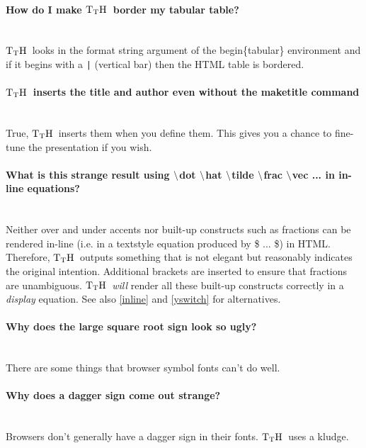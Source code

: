 \documentclass[12pt]{article}
\def\TtH{$\rm{}T_TH$}
\begin{document}
\paragraph{How do I make \TtH\ border my tabular table?}\leavevmode\\
\TtH\ looks in the format string argument of the begin\{tabular\}
environment and if it begins with a \verb!|! (vertical bar) then the HTML
table is bordered.

\paragraph{\TtH\ inserts the title and author even without the
maketitle command}\leavevmode\\
True, \TtH\ inserts them when you define them. This gives you a chance
to fine-tune the presentation if you wish.

\ifx\TtMgold\undefined
\paragraph{What is this strange result using $\tt\backslash$dot
$\tt\backslash$hat $\tt\backslash$tilde $\tt\backslash$frac
$\tt\backslash$vec ... in in-line equations?}\leavevmode\\
Neither over and under accents nor built-up constructs such as
fractions can be rendered in-line (i.e. in a textstyle equation
produced by \$ ... \$) in HTML. Therefore, \TtH\ outputs something that is
not elegant but reasonably indicates the original
intention. Additional brackets are inserted to ensure that fractions
are unambiguous. \TtH\ \emph{will} render all these built-up constructs
correctly in a \emph{display} equation. See also \ref{inline} and
\ref{yswitch} for alternatives.
\fi

\paragraph{Why does the large square root sign look so ugly?}\leavevmode\\
There are some things that browser symbol fonts can't do well.

\paragraph{Why does a dagger sign come out strange?}\leavevmode\\
Browsers don't generally have a dagger sign in their fonts. \TtH\ uses a
kludge.
\end{document}
